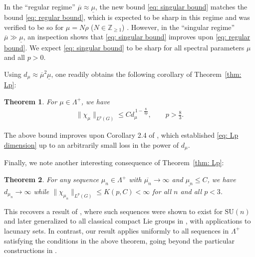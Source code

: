 \documentclass{amsart}
\numberwithin{equation}{section}
\newtheorem{thm}{Theorem}[section]
\numberwithin{equation}{section}
\begin{document}
In the ``regular regime'' $\overline{\mu} \approx \underline{\mu}$, the new bound \eqref{eq: singular bound} matches the bound \eqref{eq: regular bound}, which is expected to be sharp in this regime and was verified to be so for $\mu = N\rho$ ($N \in \mathbb{Z}_{\ge 1}$) \cite{Zha26}. 
However, in the ``singular regime'' $\overline{\mu}\gg\underline{\mu}$, an inspection shows that \eqref{eq: singular bound} improves upon \eqref{eq: regular bound}.
We expect \eqref{eq: singular bound} to be sharp for all spectral parameters $\mu$ and all $p>0$. 

Using $d_\mu\approx \overline{\mu}^2\underline{\mu}$, one readily obtains the following corollary of Theorem~\ref{thm: Lp}:

\begin{thm}
    For $\mu\in\Lambda^+$, we have 
    \begin{align}\label{eq: Lp dimension}
\|\chi_\mu\|_{L^p(G)}
\leq C
d_{\mu}^{\,1-\frac{8}{3p}},\qquad p>\frac83.
\end{align}
\end{thm}


The above bound improves upon Corollary 2.4 of \cite{Doo79}, which established \eqref{eq: Lp dimension} up to an arbitrarily small loss in the power of \(d_\mu\). 


Finally, we note another interesting consequence of Theorem~\ref{thm: Lp}: 

\begin{thm}
    For any sequence \(\mu_n \in \Lambda^+\) with \(\overline{\mu_n} \to \infty\) and 
\(\underline{\mu_n}\leq C\), we have \(d_{\mu_n} \to \infty\) while 
\(\|\chi_{\mu_n}\|_{L^p(G)} \le K(p,C) < \infty\) for all \(n\) and all \(p < 3\). 
\end{thm}

This recovers a result of \cite{Rid72}, where such sequences were shown to exist for $\mathrm{SU}(n)$ and later generalized to all classical compact Lie groups in \cite{Giu83}, with applications to lacunary sets. In contrast, our result applies uniformly to all sequences in $\Lambda^+$ satisfying the conditions in the above theorem, going beyond the particular constructions in \cite{Rid72, Giu83}. 

\end{document}
